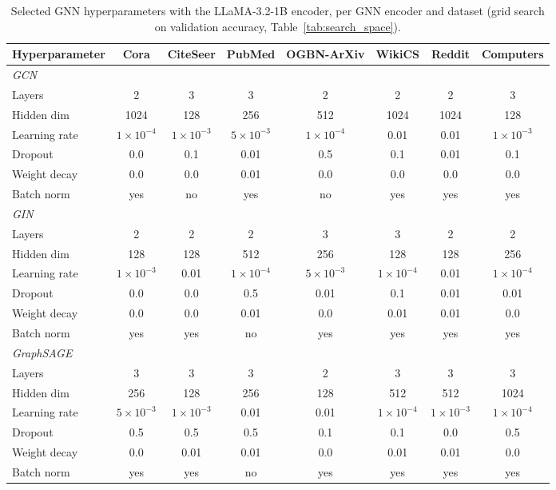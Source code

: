 \documentclass[a4paper,fleqn]{cas-sc}
\begin{document}
\begin{table}[htbp]
\centering\color{red}
\caption{Selected GNN hyperparameters with the LLaMA-3.2-1B encoder, per GNN encoder and dataset (grid search on validation accuracy, Table~\ref{tab:search_space}).}
\label{tab:gnn_hp_llama}
\footnotesize
\setlength{\tabcolsep}{3pt}
\begin{tabular*}{\textwidth}{@{\extracolsep{\fill}} lccccccc @{}}
\toprule
\textbf{Hyperparameter} & \textbf{Cora} & \textbf{CiteSeer} & \textbf{PubMed} & \textbf{OGBN-ArXiv} & \textbf{WikiCS} & \textbf{Reddit} & \textbf{Computers} \\
\midrule
\multicolumn{8}{l}{\textit{GCN}} \\
\midrule
Layers & 2 & 3 & 3 & 2 & 2 & 2 & 3 \\
Hidden dim & 1024 & 128 & 256 & 512 & 1024 & 1024 & 128 \\
Learning rate & $1\times10^{-4}$ & $1\times10^{-3}$ & $5\times10^{-3}$ & $1\times10^{-4}$ & 0.01 & 0.01 & $1\times10^{-3}$ \\
Dropout & 0.0 & 0.1 & 0.01 & 0.5 & 0.1 & 0.01 & 0.1 \\
Weight decay & 0.0 & 0.0 & 0.01 & 0.0 & 0.0 & 0.0 & 0.0 \\
Batch norm & yes & no & yes & no & yes & yes & yes \\
\midrule
\multicolumn{8}{l}{\textit{GIN}} \\
\midrule
Layers & 2 & 2 & 2 & 3 & 3 & 2 & 2 \\
Hidden dim & 128 & 128 & 512 & 256 & 128 & 128 & 256 \\
Learning rate & $1\times10^{-3}$ & 0.01 & $1\times10^{-4}$ & $5\times10^{-3}$ & $1\times10^{-4}$ & 0.01 & $1\times10^{-4}$ \\
Dropout & 0.0 & 0.0 & 0.5 & 0.01 & 0.1 & 0.01 & 0.01 \\
Weight decay & 0.0 & 0.0 & 0.01 & 0.0 & 0.01 & 0.01 & 0.0 \\
Batch norm & yes & yes & no & yes & yes & yes & yes \\
\midrule
\multicolumn{8}{l}{\textit{GraphSAGE}} \\
\midrule
Layers & 3 & 3 & 3 & 2 & 3 & 3 & 3 \\
Hidden dim & 256 & 128 & 256 & 128 & 512 & 512 & 1024 \\
Learning rate & $5\times10^{-3}$ & $1\times10^{-3}$ & 0.01 & 0.01 & $1\times10^{-4}$ & $1\times10^{-3}$ & $1\times10^{-4}$ \\
Dropout & 0.5 & 0.5 & 0.5 & 0.1 & 0.1 & 0.0 & 0.5 \\
Weight decay & 0.0 & 0.01 & 0.01 & 0.0 & 0.01 & 0.01 & 0.0 \\
Batch norm & yes & yes & no & yes & yes & yes & yes \\
\bottomrule
\end{tabular*}
\end{table}
\end{document}

